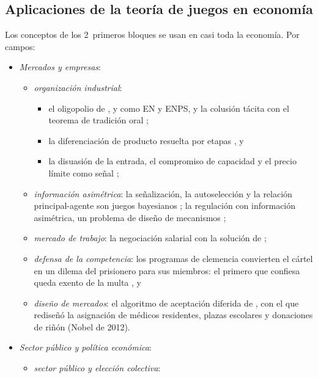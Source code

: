 \documentclass[11pt]{article}
\begin{document}
\subsection{Aplicaciones de la teoría de juegos en economía}\label{sec:aplicaciones}

Los conceptos de los 2~primeros bloques se usan en casi toda la economía. Por campos:
\begin{itemize}
\item \emph{Mercados y empresas}:
  \begin{itemize}
  \item \emph{organización industrial}:
    \begin{itemize}
    \item el oligopolio de ,  y  como EN y ENPS, y la colusión tácita con el teorema de tradición oral ;
    \item la diferenciación de producto resuelta por etapas , y
    \item la disuasión de la entrada, el compromiso de capacidad y el precio límite como señal ;
    \end{itemize}
  \item \emph{información asimétrica}: la señalización, la autoselección y la relación principal-agente son juegos bayesianos ; la regulación con información asimétrica, un problema de diseño de mecanismos ;
  \item \emph{mercado de trabajo}: la negociación salarial con la solución de  ;
  \item \emph{defensa de la competencia}: los programas de clemencia convierten el cártel en un dilema del prisionero para sus miembros: el primero que confiesa queda exento de la multa  , y
  \item \emph{diseño de mercados}: el algoritmo de aceptación diferida de \textcite{GaleShapley1962College}, con el que  rediseñó la asignación de médicos residentes, plazas escolares y donaciones de riñón (Nobel de 2012).
  \end{itemize}
\item \emph{Sector público y política económica}:
  \begin{itemize}
  \item \emph{sector público y elección colectiva}:
    \begin{itemize}

\end{itemize}
\end{itemize}
\end{itemize}
\end{document}
